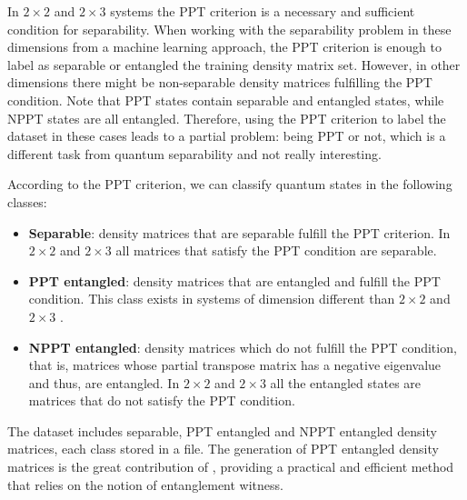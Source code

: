 In $2 \times 2$ and $2 \times 3$ systems the PPT criterion is a necessary and sufficient condition for separability. When working with the separability problem in these dimensions from a machine learning approach, the PPT criterion is enough to label as separable or entangled the training density matrix set. However, in other dimensions there might be non-separable density matrices fulfilling the PPT condition. Note that PPT states contain separable and entangled states, while NPPT states are all entangled. Therefore, using the PPT criterion to label the dataset in these cases leads to a partial problem: being PPT or not, which is a different task from quantum separability and not really interesting. 

According to the PPT criterion, we can classify quantum states in the following classes:
\begin{itemize}
    \item \textbf{Separable}: density matrices that are separable fulfill the PPT criterion. In $2 \times 2$ and $2 \times 3$ all matrices that satisfy the PPT condition are separable.
    \item \textbf{PPT entangled}: density matrices that are entangled and fulfill the PPT condition. This class exists in systems of dimension different than $2 \times 2$ and $2 \times 3$ .
    \item \textbf{NPPT entangled}: density matrices which do not fulfill the PPT condition, that is, matrices whose partial transpose matrix has a negative eigenvalue and thus, are entangled. In $2 \times 2$ and $2 \times 3$ all the entangled states are matrices that do not satisfy the PPT condition.
\end{itemize}

The dataset includes separable, PPT entangled and NPPT entangled density matrices, each class stored in a file. The generation of PPT entangled density matrices is the great contribution of \cite{casale2023large}, providing a practical and efficient method that relies on the notion of entanglement witness.

